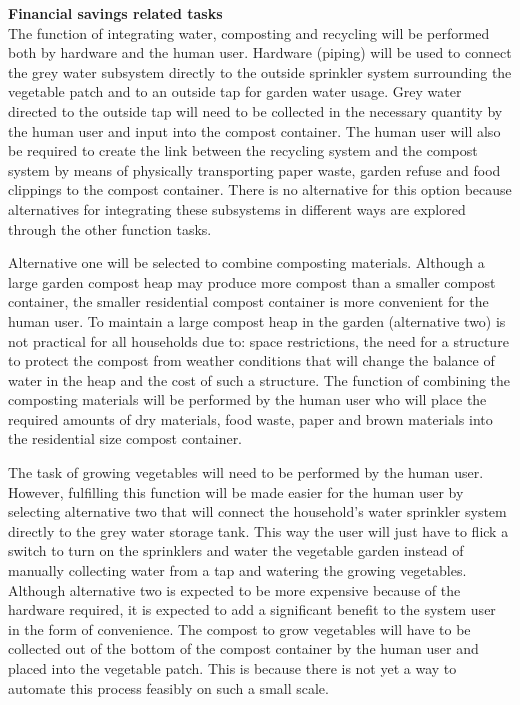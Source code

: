 \documentclass[a4paper,11pt,fleqn]{report}
\begin{document}
\textbf{Financial savings related tasks}\\
The function of integrating water, composting and recycling will be performed both by hardware and the human user. Hardware (piping) will be used to connect the grey water subsystem directly to the outside sprinkler system surrounding the vegetable patch and to an outside tap for garden water usage. Grey water directed to the outside tap will need to be collected in the necessary quantity by the human user and input into the compost container. The human user will also be required to create the link between the recycling system and the compost system by means of physically transporting paper waste, garden refuse and food clippings to the compost container. There is no alternative for this option because alternatives for integrating these subsystems in different ways are explored through the other function tasks.

Alternative one will be selected to combine composting materials. Although a large garden compost heap may produce more compost than a smaller compost container, the smaller residential compost container is more convenient for the human user. To maintain a large compost heap in the garden (alternative two) is not practical for all households due to: space restrictions, the need for a structure to protect the compost from weather conditions that will change the balance of water in the heap and the cost of such a structure. The function of combining the composting materials will be performed by the human user who will place the required amounts of dry materials, food waste, paper and brown materials into the residential size compost container.

The task of growing vegetables will need to be performed by the human user. However, fulfilling this function will be made easier for the human user by selecting alternative two that will connect the household's water sprinkler system directly to the grey water storage tank. This way the user will just have to flick a switch to turn on the sprinklers and water the vegetable garden instead of manually collecting water from a tap and watering the growing vegetables. Although alternative two is expected to be more expensive because of the hardware required, it is expected to add a significant benefit to the system user in the form of convenience. The compost to grow vegetables will have to be collected out of the bottom of the compost container by the human user and placed into the vegetable patch. This is because there is not yet a way to automate this process feasibly on such a small scale.
\end{document}

